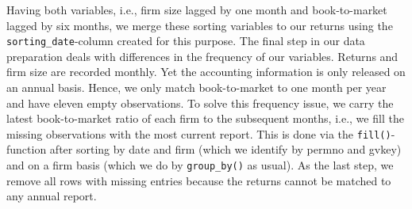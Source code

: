 \documentclass[
]{book}
\begin{document}
Having both variables, i.e., firm size lagged by one month and book-to-market lagged by six months, we merge these sorting variables to our returns using the \texttt{sorting\_date}-column created for this purpose. The final step in our data preparation deals with differences in the frequency of our variables. Returns and firm size are recorded monthly. Yet the accounting information is only released on an annual basis. Hence, we only match book-to-market to one month per year and have eleven empty observations. To solve this frequency issue, we carry the latest book-to-market ratio of each firm to the subsequent months, i.e., we fill the missing observations with the most current report. This is done via the \texttt{fill()}-function after sorting by date and firm (which we identify by permno and gvkey) and on a firm basis (which we do by \texttt{group\_by()} as usual). As the last step, we remove all rows with missing entries because the returns cannot be matched to any annual report.
\end{document}
